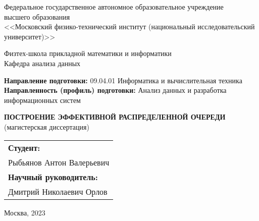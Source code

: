 \thispagestyle{empty}
\begin{center}
  Федеральное государственное автономное образовательное учреждение \\
  высшего образования \\
  <<Московский физико-технический институт (национальный исследовательский университет)>>

  \smallskip
  {\small
    Физтех-школа прикладной математики и информатики \\
    Кафедра анализа данных
  }
\end{center}

\bigskip
{
  \small\noindent
  \textbf{Направление подготовки:} 09.04.01 Информатика и вычислительная техника \\
  \textbf{Направленность (профиль) подготовки:} Анализ данных и разработка информационных систем
}

\vspace{0pt plus 8fill}

\begin{center}
  \textbf{
    \MakeUppercase{Построение эффективной распределенной очереди}\\
  }
  (магистерская диссертация)

  \vspace{0pt plus 3fill}

  \begin{flushright}
    \begin{tabular}{l}
      \textbf{Студент:}              \\
      Рыбьянов Антон Валерьевич      \\[7ex]

      \textbf{Научный руководитель:} \\
      Дмитрий Николаевич Орлов
    \end{tabular}
  \end{flushright}

  \vspace{0pt plus 4fill}
  {Москва, 2023}
\end{center}


